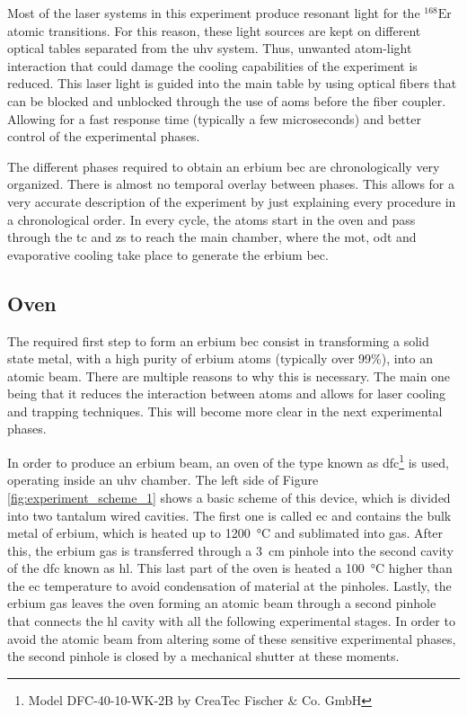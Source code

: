 Most of the laser systems in this experiment produce resonant light for the $^{\text{168}}\text{Er}$ atomic transitions. For this reason, these light sources are kept on different optical tables separated from the \ac{uhv} system. Thus, unwanted atom-light interaction that could damage the cooling capabilities of the experiment is reduced. This laser light is guided into the main table by using optical fibers that can be blocked and unblocked through the use of \acp{aom} before the fiber coupler. Allowing for a fast response time (typically a few microseconds) and better control of the experimental phases.

The different phases required to obtain an erbium \ac{bec} are chronologically very organized. There is almost no temporal overlay between phases. This allows for a very accurate description of the experiment by just explaining every procedure in a chronological order. In every cycle, the atoms start in the oven and pass through the \ac{tc} and \acf{zs} to reach the main chamber, where the \ac{mot}, \ac{odt} and evaporative cooling take place to generate the erbium \acl*{bec}.

\subsection{Oven}\label{subsec:oven}

The required first step to form an erbium \ac{bec} consist in transforming a solid state metal, with a high purity of erbium atoms (typically over 99\%), into an atomic beam. There are multiple reasons to why this is necessary. The main one being that it reduces the interaction between atoms and allows for laser cooling and trapping techniques. This will become more clear in the next experimental phases.

In order to produce an erbium beam, an oven of the type known as \Acf{dfc}\footnote{Model DFC-40-10-WK-2B by CreaTec Fischer \& Co. GmbH} is used, operating inside an \ac{uhv} chamber. The left side of Figure \ref{fig:experiment_scheme_1} shows a basic scheme of this device, which is divided into two tantalum wired cavities. The first one is called \Acf{ec} and contains the bulk metal of erbium, which is heated up to \SI{1200}{\degreeCelsius} and sublimated into gas. After this, the erbium gas is transferred through a \SI{3}{\centi\meter} pinhole into the second cavity of the \ac{dfc} known as \Acf{hl}. This last part of the oven is heated a \SI{100}{\degreeCelsius} higher than the \ac{ec} temperature to avoid condensation of material at the pinholes. Lastly, the erbium gas leaves the oven forming an atomic beam through a second pinhole that connects the \ac{hl} cavity with all the following experimental stages. In order to avoid the atomic beam from altering some of these sensitive experimental phases, the second pinhole is closed by a mechanical shutter at these moments. 

